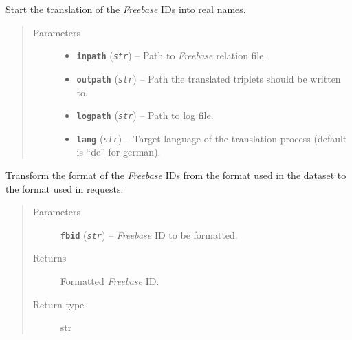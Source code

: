 \documentclass[letterpaper,10pt,english]{sphinxmanual}
\begin{document}
\begin{fulllineitems}
\label{src.prep.relations:src.prep.relations.relations.fetch_relation_triples_of_file}
Start the translation of the \emph{Freebase} IDs into real names.
\begin{quote}\begin{description}
\item[{Parameters}] \leavevmode\begin{itemize}
\item {} 
\textbf{\texttt{inpath}} (\emph{\texttt{str}}) -- Path to \emph{Freebase} relation file.

\item {} 
\textbf{\texttt{outpath}} (\emph{\texttt{str}}) -- Path the translated triplets should be written to.

\item {} 
\textbf{\texttt{logpath}} (\emph{\texttt{str}}) -- Path to log file.

\item {} 
\textbf{\texttt{lang}} (\emph{\texttt{str}}) -- Target language of the translation process (default is ``de'' for german).

\end{itemize}

\end{description}\end{quote}

\end{fulllineitems}


\begin{fulllineitems}
\label{src.prep.relations:src.prep.relations.relations.format_fbid}
Transform the format of the \emph{Freebase} IDs from the format used in the dataset to the format used in requests.
\begin{quote}\begin{description}
\item[{Parameters}] \leavevmode
\textbf{\texttt{fbid}} (\emph{\texttt{str}}) -- \emph{Freebase} ID to be formatted.

\item[{Returns}] \leavevmode
Formatted \emph{Freebase} ID.

\item[{Return type}] \leavevmode
str

\end{description}\end{quote}

\end{fulllineitems}
\end{document}
